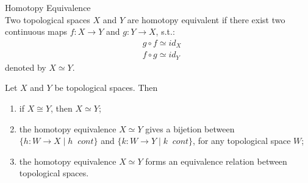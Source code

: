 \begin{definition}{Homotopy Equivalence}\\
Two topological spaces $X$ and $Y$ are homotopy equivalent if there exist two continuous maps $f : X \rightarrow Y$ and $g : Y \rightarrow X$, s.t.:
\begin{align*}
    &g \circ f \simeq id_X\\
    &f \circ g \simeq id_Y
\end{align*}
denoted by $X \simeq Y$.
\end{definition}

\begin{proposition}
    Let $X$ and $Y$ be topological spaces. Then
    \begin{enumerate}
        \item if $X \cong Y$, then $X \simeq Y$;
        \item the homotopy equivalence $X \simeq Y$ gives a bijetion between $\{ h: W \rightarrow X \mid h\;\;cont\}$ and $\{ k: W \rightarrow Y \mid k\;\;cont\}$, for any topological space $W$;
        \item the homotopy equivalence $X \simeq Y$ forms an equivalence relation between topological spaces.
    \end{enumerate}
\end{proposition}


